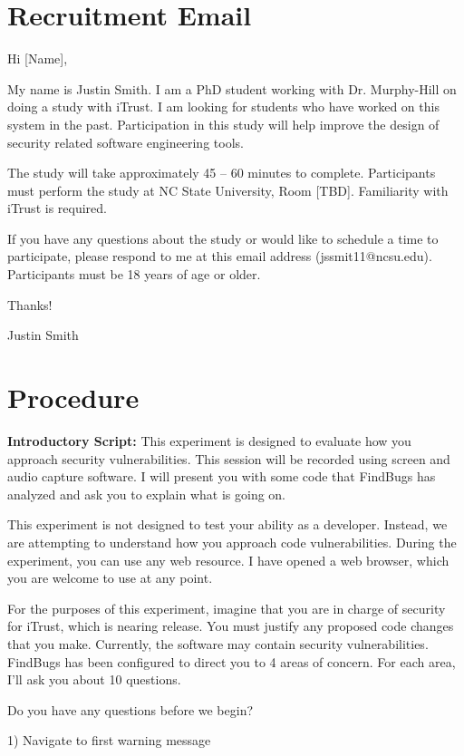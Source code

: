 \documentclass[10pt,journal,compsoc]{IEEEtran}
\begin{document}
\section*{Recruitment Email}
Hi [Name],

My name is Justin Smith. I am a PhD student working with Dr. Murphy-Hill on doing a study with iTrust.
I am looking for students who have worked on this system in the past. Participation in this study will help
improve the design of security related software engineering tools.

The study will take approximately 45 -- 60 minutes to complete. Participants must perform the study at
NC State University, Room [TBD]. Familiarity with iTrust is required.

If you have any questions about the study or would like to schedule a time to participate, please respond
to me at this email address (jssmit11@ncsu.edu).
Participants must be 18 years of age or older.

\noindent Thanks!

\noindent Justin Smith 

\section*{Procedure}

\textbf{Introductory Script:} This experiment is designed to evaluate how you approach security vulnerabilities. This session
will be recorded using screen and audio capture software. I will present you with some code that
FindBugs has analyzed and ask you to explain what is going on.

This experiment is not designed to test your ability as a developer. Instead, we are attempting to
understand how you approach code vulnerabilities. During the experiment, you can use any web
resource. I have opened a web browser, which you are welcome to use at any point.

For the purposes of this experiment, imagine that you are in charge of security for iTrust, which
is nearing release. You must justify any proposed code changes that you make. Currently, the
software may contain security vulnerabilities. FindBugs has been configured to direct you to 4
areas of concern. For each area, I'll ask you about 10 questions.

Do you have any questions before we begin?

1) Navigate to first warning message
\end{document}
